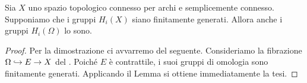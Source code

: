 \begin{proposition}
Sia $X$ uno spazio topologico connesso per archi e semplicemente connesso. Supponiamo che i gruppi $H_i(X)$ siano finitamente generati. Allora anche i gruppi $H_i(\Omega)$ lo sono.
\end{proposition}
\begin{proof}
Per la dimostrazione ci avvarremo del seguente.
Consideriamo la fibrazione $\Omega\hookrightarrow E\to X$ del . Poiché $E$ è contrattile, i suoi gruppi di omologia sono finitamente generati. Applicando il Lemma si ottiene immediatamente la tesi.
\end{proof}
